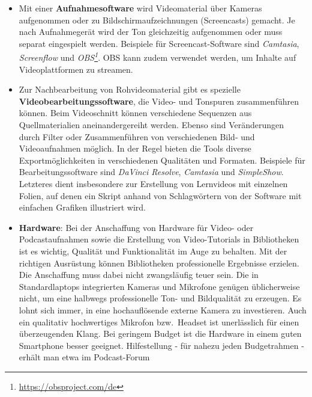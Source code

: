 \documentclass[
  11pt,
  letterpaper,
  DIV=11,
  twoside]{scrreprt}
\providecommand{\tightlist}{%
  \setlength{\itemsep}{0pt}\setlength{\parskip}{0pt}}\usepackage{longtable,booktabs,array}
\DeclareRobustCommand{\href}[2]{#2\footnote{\url{#1}}}
\begin{document}
\begin{itemize}
  \begin{itemize}
  \tightlist
  \item
    Audiobearbeitungs-Software
    z.\,B.~\emph{\href{https://www.audacity.de/}{Audacity}}
  \item
    Professionelle Podcast-Produktion
    z.\,B.~\emph{\href{https://ultraschall.fm/}{Ultraschall}}
  \end{itemize}
\item
  Mit einer \textbf{Aufnahmesoftware} wird Videomaterial über Kameras
  aufgenommen oder zu Bildschirmaufzeichnungen (Screencasts) gemacht. Je
  nach Aufnahmegerät wird der Ton gleichzeitig aufgenommen oder muss
  separat eingespielt werden. Beispiele für Screencast-Software sind
  \emph{Camtasia}, \emph{Screenflow} und
  \emph{\href{https://obsproject.com/de}{OBS}}. OBS kann zudem verwendet
  werden, um Inhalte auf Videoplattformen zu streamen.
\item
  Zur Nachbearbeitung von Rohvideomaterial gibt es spezielle
  \textbf{Videobearbeitungssoftware}, die Video- und Tonspuren
  zusammenführen können. Beim Videoschnitt können verschiedene Sequenzen
  aus Quellmaterialien aneinandergereiht werden. Ebenso sind
  Veränderungen durch Filter oder Zusammenführen von verschiedenen Bild-
  und Videoaufnahmen möglich. In der Regel bieten die Tools diverse
  Exportmöglichkeiten in verschiedenen Qualitäten und Formaten.
  Beispiele für Bearbeitungssoftware sind \emph{DaVinci Resolve},
  \emph{Camtasia} und \emph{SimpleShow}. Letzteres dient insbesondere
  zur Erstellung von Lernvideos mit einzelnen Folien, auf denen ein
  Skript anhand von Schlagwörtern von der Software mit einfachen
  Grafiken illustriert wird.
\item
  \textbf{Hardware}: Bei der Anschaffung von Hardware für Video- oder
  Podcastaufnahmen sowie die Erstellung von Video-Tutorials in
  Bibliotheken ist es wichtig, Qualität und Funktionalität im Auge zu
  behalten. Mit der richtigen Ausrüstung können Bibliotheken
  professionelle Ergebnisse erzielen. Die Anschaffung muss dabei nicht
  zwangsläufig teuer sein. Die in Standardlaptops integrierten Kameras
  und Mikrofone genügen üblicherweise nicht, um eine halbwegs
  professionelle Ton- und Bildqualität zu erzeugen. Es lohnt sich immer,
  in eine hochauflösende externe Kamera zu investieren. Auch ein
  qualitativ hochwertiges Mikrofon bzw.~Headset ist unerlässlich für
  einen überzeugenden Klang. Bei geringem Budget ist die Hardware in
  einem guten Smartphone besser geeignet. Hilfestellung - für nahezu
  jeden Budgetrahmen - erhält man etwa im Podcast-Forum

\end{itemize}
\end{document}
